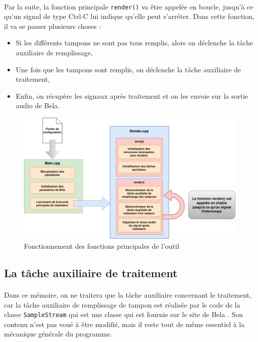 \paragraph{}
Par la suite, la fonction principale \verb!render()! va être appelée en boucle, jusqu'à ce qu'un signal de type Ctrl-C lui indique qu'elle peut s'arrêter. Dans cette fonction, il va se passer plusieurs choses :
\begin{itemize}
    \item Si les différents tampons ne sont pas tous remplis, alors on déclenche la tâche auxiliaire de remplissage,
    \item Une fois que les tampons sont remplis, on déclenche la tâche auxiliaire de traitement,
    \item Enfin, on récupère les signaux après traitement et on les envoie sur la sortie audio de Bela.
\end{itemize}
\begin{figure}[H]
    \centering
    \includegraphics[scale=0.4]{assets/render.png}
    \caption{Fonctionnement des fonctions principales de l'outil}
    \label{focntionnement main render}
\end{figure}
\subsection{La tâche auxiliaire de traitement}
\paragraph{}
Dans ce mémoire, on ne traitera que la tâche auxiliaire concernant le traitement, car la tâche auxiliaire de remplissage de tampon est réalisée par le code de la classe \verb!SampleStream! qui est une classe qui est fournie sur le site de Bela \cite{BELA}. Son contenu n'est pas voué à être modifié, mais il reste tout de même essentiel à la mécanique générale du programme.
